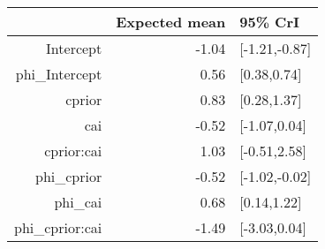 \begin{tabular}{rrl}
  \hline
 & Expected mean & 95\% CrI \\ 
  \hline
Intercept & -1.04 & [-1.21,-0.87] \\ 
  phi\_Intercept & 0.56 & [0.38,0.74] \\ 
  cprior & 0.83 & [0.28,1.37] \\ 
  cai & -0.52 & [-1.07,0.04] \\ 
  cprior:cai & 1.03 & [-0.51,2.58] \\ 
  phi\_cprior & -0.52 & [-1.02,-0.02] \\ 
  phi\_cai & 0.68 & [0.14,1.22] \\ 
  phi\_cprior:cai & -1.49 & [-3.03,0.04] \\ 
   \hline
\end{tabular}


